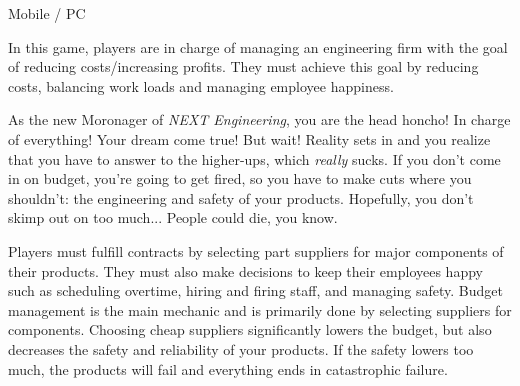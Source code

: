 \documentclass[archE1,portrait]{baposter}
\begin{document}
\begin{poster}
{ 
	Mobile / PC
}


{
	\quad In this game, players are in charge of managing an engineering firm with the goal of reducing costs/increasing profits. They must achieve this goal by reducing costs, balancing work loads and managing employee happiness.
}


{
	\quad As the new Moronager of \textit{NEXT Engineering}, you are the head honcho! In charge of everything! Your dream come true! But wait! Reality sets in and you realize that you have to answer to the higher-ups, which \textit{really} sucks. If you don't come in on budget, you're going to get fired, so you have to make cuts where you shouldn't: the engineering and safety of your products. Hopefully, you don't skimp out on too much... People could die, you know.
}


{
	\quad Players must fulfill contracts by selecting part suppliers for major components of their products. They must also make decisions to keep their employees happy such as scheduling overtime, hiring and firing staff, and managing safety. Budget management is the main mechanic and is primarily done by selecting suppliers for components. Choosing cheap suppliers significantly lowers the budget, but also decreases the safety and reliability of your products. If the safety lowers too much, the products will fail and everything ends in catastrophic failure.
	
}
\end{poster}
\end{document}
